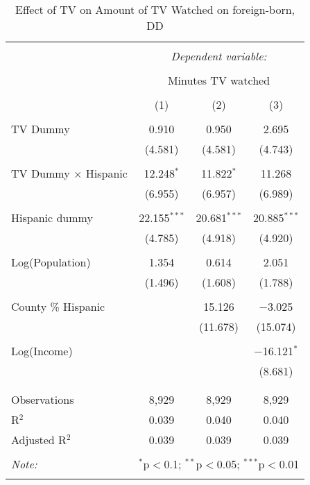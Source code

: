 
\begin{table}[!htbp] \centering 
  \caption{Effect of TV on Amount of TV Watched on foreign-born, DD} 
  \label{} 
\begin{tabular}{@{\extracolsep{-5pt}}lccc} 
\\[-1.8ex]\hline 
\hline \\[-1.8ex] 
 & \multicolumn{3}{c}{\textit{Dependent variable:}} \\ 
\cline{2-4} 
\\[-1.8ex] & \multicolumn{3}{c}{Minutes TV watched} \\ 
\\[-1.8ex] & (1) & (2) & (3)\\ 
\hline \\[-1.8ex] 
 TV Dummy & 0.910 & 0.950 & 2.695 \\ 
  & (4.581) & (4.581) & (4.743) \\ 
  & & & \\ 
 TV Dummy $\times$ Hispanic  & 12.248$^{*}$ & 11.822$^{*}$ & 11.268 \\ 
  & (6.955) & (6.957) & (6.989) \\ 
  & & & \\ 
 Hispanic dummy & 22.155$^{***}$ & 20.681$^{***}$ & 20.885$^{***}$ \\ 
  & (4.785) & (4.918) & (4.920) \\ 
  & & & \\ 
 Log(Population) & 1.354 & 0.614 & 2.051 \\ 
  & (1.496) & (1.608) & (1.788) \\ 
  & & & \\ 
 County \% Hispanic &  & 15.126 & $-$3.025 \\ 
  &  & (11.678) & (15.074) \\ 
  & & & \\ 
 Log(Income) &  &  & $-$16.121$^{*}$ \\ 
  &  &  & (8.681) \\ 
  & & & \\ 
\hline \\[-1.8ex] 
Observations & 8,929 & 8,929 & 8,929 \\ 
R$^{2}$ & 0.039 & 0.040 & 0.040 \\ 
Adjusted R$^{2}$ & 0.039 & 0.039 & 0.039 \\ 
\hline 
\hline \\[-1.8ex] 
\textit{Note:}  & \multicolumn{3}{r}{$^{*}$p$<$0.1; $^{**}$p$<$0.05; $^{***}$p$<$0.01} \\ 
 & \multicolumn{3}{r}{} \\ 
\end{tabular} 
\end{table} 
